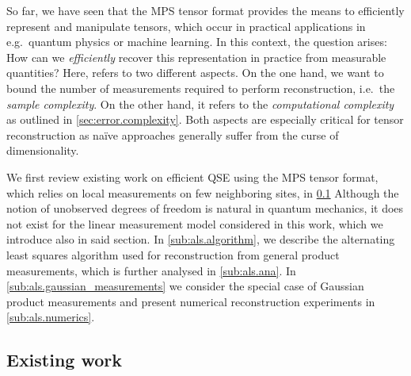 So far, we have seen that the MPS tensor format provides the means to efficiently represent and manipulate tensors, which occur in practical applications in e.g.\ quantum physics or machine learning.
In this context, the question arises: How can we \emph{efficiently} recover this representation in practice from measurable quantities?
Here,  refers to two different aspects.
On the one hand, we want to bound the number of measurements required to perform reconstruction, i.e.\ the \emph{sample complexity}.
On the other hand, it refers to the \emph{computational complexity} as outlined in \cref{sec:error.complexity}.
Both aspects are especially critical for tensor reconstruction as na\"ive approaches generally suffer from the curse of dimensionality.

We first review existing work on efficient QSE using the MPS tensor format, which relies on local measurements on few neighboring sites, in \cref{sub:als.existing}
Although the notion of  unobserved degrees of freedom is natural in quantum mechanics, it does not exist for the linear measurement model considered in this work, which we introduce also in said section.
In \cref{sub:als.algorithm}, we describe the alternating least squares algorithm used for reconstruction from general product measurements, which is further analysed in \cref{sub:als.ana}.
In \cref{sub:als.gaussian_measurements} we consider the special case of Gaussian product measurements and present numerical reconstruction experiments in \cref{sub:als.numerics}.


\subsection{Existing work}%
\label{sub:als.existing}

